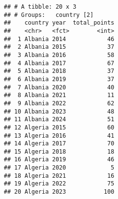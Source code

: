 \documentclass[
]{article}
\newenvironment{Shaded}{\begin{snugshade}}{\end{snugshade}}
\newcommand{\DecValTok}[1]{\textcolor[rgb]{0.00,0.00,0.81}{#1}}
\newcommand{\FunctionTok}[1]{\textcolor[rgb]{0.13,0.29,0.53}{\textbf{#1}}}
\newcommand{\NormalTok}[1]{#1}
\newcommand{\OtherTok}[1]{\textcolor[rgb]{0.56,0.35,0.01}{#1}}
\newcommand{\SpecialCharTok}[1]{\textcolor[rgb]{0.81,0.36,0.00}{\textbf{#1}}}
\begin{document}
\begin{Shaded}
\end{Shaded}

\begin{verbatim}
## # A tibble: 20 x 3
## # Groups:   country [2]
##    country year  total_points
##    <chr>   <fct>        <int>
##  1 Albania 2014            46
##  2 Albania 2015            37
##  3 Albania 2016            58
##  4 Albania 2017            67
##  5 Albania 2018            37
##  6 Albania 2019            37
##  7 Albania 2020            40
##  8 Albania 2021            11
##  9 Albania 2022            62
## 10 Albania 2023            48
## 11 Albania 2024            51
## 12 Algeria 2015            60
## 13 Algeria 2016            41
## 14 Algeria 2017            70
## 15 Algeria 2018            18
## 16 Algeria 2019            46
## 17 Algeria 2020             5
## 18 Algeria 2021            16
## 19 Algeria 2022            75
## 20 Algeria 2023           100
\end{verbatim}
\end{document}

